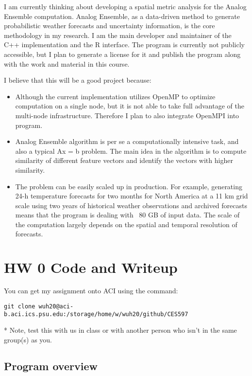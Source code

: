 \documentclass{article}
\begin{document}
\begin{spacing}{1.1}
I am currently thinking about developing a spatial metric analysis for the Analog Ensemble computation. Analog Ensemble, as a data-driven method to generate probabilistic weather forecasts and uncertainty information, is the core methodology in my research. I am the main developer and maintainer of the C++ implementation and the R interface. The program is currently not publicly accessible, but I plan to generate a license for it and publish the program along with the work and material in this course.

I believe that this will be a good project because:

\begin{itemize}
  \item Although the current implementation utilizes OpenMP to optimize computation on a single node, but it is not able to take full advantage of the multi-node infrastructure. Therefore I plan to also integrate OpenMPI into program.
  \item Analog Ensemble algorithm is per se a computationally intensive task, and also a typical Ax = b problem. The main idea in the algorithm is to compute similarity of different feature vectors and identify the vectors with higher similarity.
  \item The problem can be easily scaled up in production. For example, generating 24-h temperature forecasts for two months for North America at a 11 km grid scale using two years of historical weather observations and archived forecasts means that the program is dealing with ~80 GB of input data. The scale of the computation largely depends on the spatial and temporal resolution of forecasts.
\end{itemize}


\section{HW 0 Code and Writeup}

You can get my assignment onto ACI using the command:

\begin{verbatim}
git clone wuh20@aci-b.aci.ics.psu.edu:/storage/home/w/wuh20/github/CES597
\end{verbatim}

* Note, test this with us in class or with another person who isn't in the same group(s) as you.

\subsection{Program overview}


\end{spacing}
\end{document}
